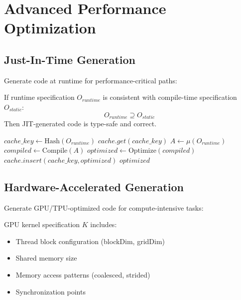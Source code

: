 \section{Advanced Performance Optimization}

\subsection{Just-In-Time Generation}

Generate code at runtime for performance-critical paths:

\begin{theorem}
    If runtime specification $O_{runtime}$ is consistent with compile-time specification $O_{static}$:
    \begin{equation}
        O_{runtime} \supseteq O_{static}
    \end{equation}
    Then JIT-generated code is type-safe and correct.
\end{theorem}

\begin{algorithm}
\caption{JIT Code Generation}
\begin{algorithmic}[1]
    \State $cache\_key \gets \text{Hash}(O_{runtime})$
        \State \Return $cache.get(cache\_key)$ 
    \EndIf
    \State $A \gets \mu(O_{runtime})$ 
    \State $compiled \gets \text{Compile}(A)$ 
    \State $optimized \gets \text{Optimize}(compiled)$ 
    \State $cache.insert(cache\_key, optimized)$
    \State \Return $optimized$
\EndProcedure
\end{algorithmic}
\end{algorithm}

\subsection{Hardware-Accelerated Generation}

Generate GPU/TPU-optimized code for compute-intensive tasks:

\begin{definition}
    GPU kernel specification $K$ includes:
    \begin{itemize}
        \item Thread block configuration (blockDim, gridDim)
        \item Shared memory size
        \item Memory access patterns (coalesced, strided)
        \item Synchronization points
    \end{itemize}
\end{definition}

